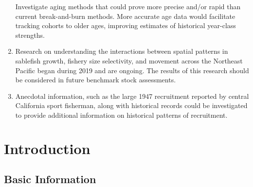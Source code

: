 \documentclass[11pt,
  english,
  a4paper,
]{article}
\begin{document}
\begin{enumerate}
  Investigate aging methods that could prove more precise and/or rapid than current break-and-burn methods. More accurate age data would facilitate tracking cohorts to older ages, improving estimates of historical year-class strengths.

  \leavevmode\tagmcend\tagstructend\par
\item

  Research on understanding the interactions between spatial patterns in sablefish growth, fishery size selectivity, and movement across the Northeast Pacific began during 2019 and are ongoing. The results of this research should be considered in future benchmark stock assessments.

  \leavevmode\tagmcend\tagstructend\par
\item

  Anecdotal information, such as the large 1947 recruitment reported by central California sport fisherman, along with historical records could be investigated to provide additional information on historical patterns of recruitment.

  \leavevmode\tagmcend\tagstructend\par
\end{enumerate}

\tagstructend

\pagebreak
\setlength{\parskip}{5mm plus1mm minus1mm}
\setcounter{page}{1}
\renewcommand{\thefigure}{\arabic{figure}}
\renewcommand{\thetable}{\arabic{table}}
\setcounter{table}{0}
\setcounter{figure}{0}


\hypertarget{introduction}{%
\section{Introduction}\label{introduction}}

\leavevmode\tagmcend\tagstructend


\hypertarget{basic-information}{%
\subsection{Basic Information}\label{basic-information}}
\end{document}
